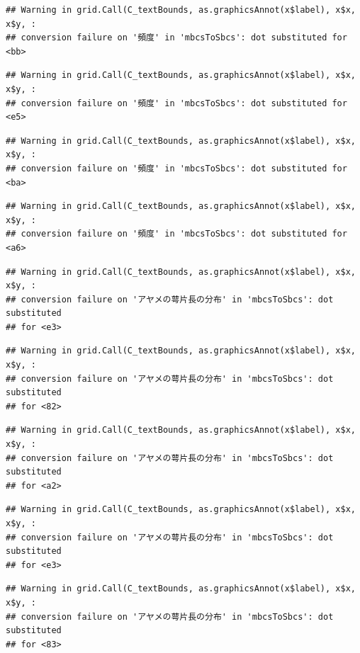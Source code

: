 \documentclass[
]{book}
\begin{document}
\begin{verbatim}
## Warning in grid.Call(C_textBounds, as.graphicsAnnot(x$label), x$x, x$y, :
## conversion failure on '頻度' in 'mbcsToSbcs': dot substituted for <bb>
\end{verbatim}

\begin{verbatim}
## Warning in grid.Call(C_textBounds, as.graphicsAnnot(x$label), x$x, x$y, :
## conversion failure on '頻度' in 'mbcsToSbcs': dot substituted for <e5>
\end{verbatim}

\begin{verbatim}
## Warning in grid.Call(C_textBounds, as.graphicsAnnot(x$label), x$x, x$y, :
## conversion failure on '頻度' in 'mbcsToSbcs': dot substituted for <ba>
\end{verbatim}

\begin{verbatim}
## Warning in grid.Call(C_textBounds, as.graphicsAnnot(x$label), x$x, x$y, :
## conversion failure on '頻度' in 'mbcsToSbcs': dot substituted for <a6>
\end{verbatim}

\begin{verbatim}
## Warning in grid.Call(C_textBounds, as.graphicsAnnot(x$label), x$x, x$y, :
## conversion failure on 'アヤメの萼片長の分布' in 'mbcsToSbcs': dot substituted
## for <e3>
\end{verbatim}

\begin{verbatim}
## Warning in grid.Call(C_textBounds, as.graphicsAnnot(x$label), x$x, x$y, :
## conversion failure on 'アヤメの萼片長の分布' in 'mbcsToSbcs': dot substituted
## for <82>
\end{verbatim}

\begin{verbatim}
## Warning in grid.Call(C_textBounds, as.graphicsAnnot(x$label), x$x, x$y, :
## conversion failure on 'アヤメの萼片長の分布' in 'mbcsToSbcs': dot substituted
## for <a2>
\end{verbatim}

\begin{verbatim}
## Warning in grid.Call(C_textBounds, as.graphicsAnnot(x$label), x$x, x$y, :
## conversion failure on 'アヤメの萼片長の分布' in 'mbcsToSbcs': dot substituted
## for <e3>
\end{verbatim}

\begin{verbatim}
## Warning in grid.Call(C_textBounds, as.graphicsAnnot(x$label), x$x, x$y, :
## conversion failure on 'アヤメの萼片長の分布' in 'mbcsToSbcs': dot substituted
## for <83>
\end{verbatim}
\end{document}
